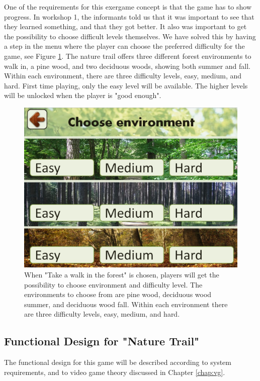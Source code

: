 One of the requirements for this exergame concept is that the game has to show progress. In workshop 1, the informants told us that it was important to see that they learned something, and that they got better. It also was important to get the possibility to choose difficult levels themselves. We have solved this by having a step in the menu where the player can choose the preferred difficulty for the game, see Figure \ref{fig:omgivelseNivaa}. The nature trail offers three different forest environments to walk in, a pine wood, and two deciduous woods, showing both summer and fall. Within each environment, there are three difficulty levels, easy, medium, and hard. First time playing, only the easy level will be available. The higher levels will be unlocked when the player is "good enough".   

\begin{figure} [H]
\centering
\includegraphics[scale=0.45]{chooseEnvironment.jpg}
\caption[Choice of environment and difficulty level]{When "Take a walk in the forest" is chosen, players will get the possibility to choose environment and difficulty level. The environments to choose from are pine wood, deciduous wood summer, and deciduous wood fall. Within each environment there are three difficulty levels, easy, medium, and hard.}
\label{fig:omgivelseNivaa}
\end{figure}
     
\subsection{Functional Design for "Nature Trail"}
The functional design for this game will be described according to system requirements, and to video game theory discussed in Chapter \ref{chap:vg}.

